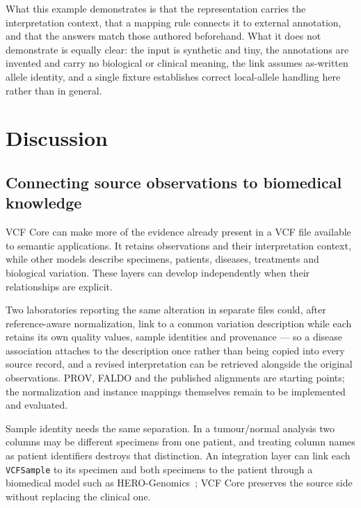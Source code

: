 \documentclass{ceurart}
\newcommand{\term}[1]{\texttt{#1}}
\begin{document}
What this example demonstrates is that the representation carries the interpretation context, that a mapping rule connects it to external annotation, and that the answers match those authored beforehand. 
What it does not demonstrate is equally clear: the input is synthetic and tiny, the annotations are invented and carry no biological or clinical meaning, the link assumes as-written allele identity, and a single fixture establishes correct local-allele handling here rather than in general.

\section{Discussion}
\label{sec:discussion}

\subsection{Connecting source observations to biomedical knowledge}

VCF Core can make more of the evidence already present in a VCF file available to semantic applications. It retains observations and their interpretation context, while other models describe specimens, patients, diseases, treatments and biological variation. These layers can develop independently when their relationships are explicit.

Two laboratories reporting the same alteration in separate files could, after reference-aware normalization, link to a common variation description while each retains its own quality values, sample identities and provenance --- so a disease association attaches to the description once rather than being copied into every source record, and a revised interpretation can be retrieved alongside the original observations. PROV, FALDO and the published alignments are starting points; the normalization and instance mappings themselves remain to be implemented and evaluated.

Sample identity needs the same separation. In a tumour/normal analysis two columns may be different specimens from one patient, and treating column names as patient identifiers destroys that distinction. An integration layer can link each \term{VCFSample} to its specimen and both specimens to the patient through a biomedical model such as HERO-Genomics~\cite{cazzaro2025hero}; VCF Core preserves the source side without replacing the clinical one.
\end{document}
